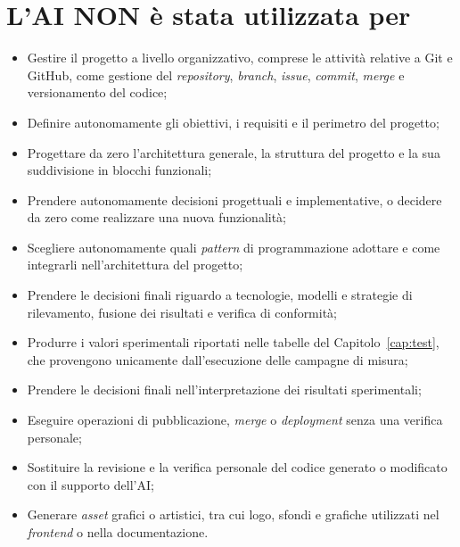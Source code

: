 \section*{L'AI NON è stata utilizzata per}

\begin{itemize}
	\item Gestire il progetto a livello organizzativo, comprese le attività relative a Git e GitHub, come gestione del \textit{repository}, \textit{branch}, \textit{issue}, \textit{commit}, \textit{merge} e versionamento del codice;
	\item Definire autonomamente gli obiettivi, i requisiti e il perimetro del progetto;
	\item Progettare da zero l'architettura generale, la struttura del progetto e la sua suddivisione in blocchi funzionali;
	\item Prendere autonomamente decisioni progettuali e implementative, o decidere da zero come realizzare una nuova funzionalità;
	\item Scegliere autonomamente quali \textit{pattern} di programmazione adottare e come integrarli nell'architettura del progetto;
	\item Prendere le decisioni finali riguardo a tecnologie, modelli e strategie di rilevamento, fusione dei risultati e verifica di conformità;
	\item Produrre i valori sperimentali riportati nelle tabelle del Capitolo~\ref{cap:test}, che provengono unicamente dall'esecuzione delle campagne di misura;
	\item Prendere le decisioni finali nell'interpretazione dei risultati sperimentali;
	\item Eseguire operazioni di pubblicazione, \textit{merge} o \textit{deployment} senza una verifica personale;
	\item Sostituire la revisione e la verifica personale del codice generato o modificato con il supporto dell'AI;
	\item Generare \textit{asset} grafici o artistici, tra cui logo, sfondi e grafiche utilizzati nel \textit{frontend} o nella documentazione.
\end{itemize}
